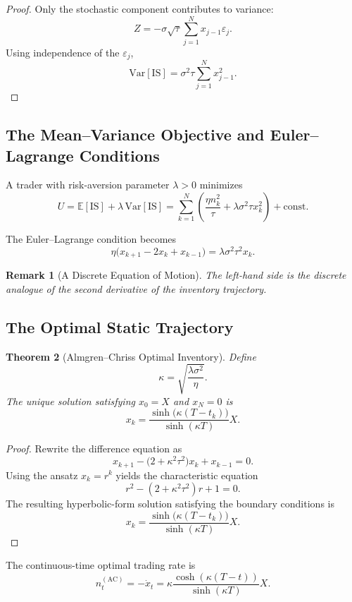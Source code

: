 \documentclass[11pt]{article}
\newtheorem{theorem}{Theorem}[section]
\newtheorem{remark}[theorem]{Remark}
\begin{document}
\begin{proof}
Only the stochastic component contributes to variance:
\[
Z = -\sigma\sqrt{\tau}\sum_{j=1}^N x_{j-1}\varepsilon_j.
\]
Using independence of the $\varepsilon_j$,
\[
\mathrm{Var}[\mathrm{IS}] = \sigma^2\tau\sum_{j=1}^N x_{j-1}^2.
\]
\end{proof}

\subsection{The Mean--Variance Objective and Euler--Lagrange Conditions}

A trader with risk-aversion parameter $\lambda > 0$ minimizes
\[
U = \mathbb{E}[\text{IS}] + \lambda\,\mathrm{Var}[\text{IS}]
= \sum_{k=1}^N\left(\frac{\eta n_k^2}{\tau} + \lambda\sigma^2\tau x_k^2\right) + \text{const}.
\]

The Euler--Lagrange condition becomes
\[
\eta\bigl(x_{k+1} - 2x_k + x_{k-1}\bigr)
= \lambda\sigma^2\tau^2 x_k.
\]

\begin{remark}[A Discrete Equation of Motion]
The left-hand side is the discrete analogue of the second derivative of the inventory trajectory.
\end{remark}

\subsection{The Optimal Static Trajectory}

\begin{theorem}[Almgren--Chriss Optimal Inventory]
Define
\[
\kappa = \sqrt{\frac{\lambda\sigma^2}{\eta}}.
\]
The unique solution satisfying $x_0 = X$ and $x_N = 0$ is
\[
\boxed{
 x_k = \frac{\sinh\bigl(\kappa(T-t_k)\bigr)}{\sinh(\kappa T)}X
}.
\]
\end{theorem}

\begin{proof}
Rewrite the difference equation as
\[
x_{k+1} - \bigl(2 + \kappa^2\tau^2\bigr)x_k + x_{k-1} = 0.
\]
Using the ansatz $x_k = r^k$ yields the characteristic equation
\[
r^2 - (2+\kappa^2\tau^2)r + 1 = 0.
\]
The resulting hyperbolic-form solution satisfying the boundary conditions is
\[
x_k = \frac{\sinh\bigl(\kappa(T-t_k)\bigr)}{\sinh(\kappa T)}X.
\]
\end{proof}

The continuous-time optimal trading rate is
\[
n_t^{(\mathrm{AC})} = -\dot{x}_t
= \kappa\frac{\cosh(\kappa(T-t))}{\sinh(\kappa T)}X.
\]
\end{document}
